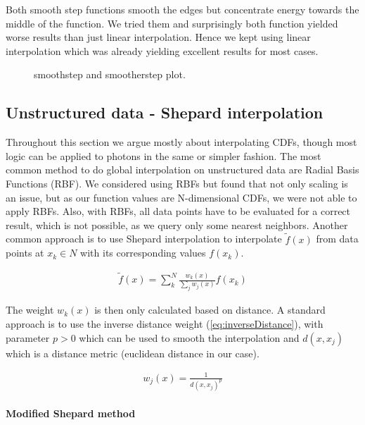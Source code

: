 Both smooth step functions smooth the edges but concentrate energy towards the middle of the function. We tried them and surprisingly both function yielded worse results than just linear interpolation. Hence we kept using linear interpolation which was already yielding excellent results for most cases.

\begin{figure}[htbp] 
	\centering
	\tiny
    
    \caption{smoothstep and smootherstep plot. } 
    \label{fig:smoothstep}
\end{figure}

\subsection{Unstructured data - Shepard interpolation}
\label{ch:unstructured}

Throughout this section we argue mostly about interpolating CDFs, though most logic can be applied to photons in the same or simpler fashion. The most common method to do global interpolation on unstructured data are Radial Basis Functions (RBF). We considered using RBFs but found that not only scaling is an issue, but as our function values are N-dimensional CDFs, we were not able to apply RBFs. Also, with RBFs, all data points have to be evaluated for a correct result, which is not possible, as we query only some nearest neighbors. Another common approach is to use Shepard interpolation to interpolate $\widetilde{f}(x)$ from data points at $x_k \in N$ with its corresponding values $f(x_k)$. 

\begin{align}\label{eq:shepard}
\widetilde{f}(x) = \sum_{k}^{N}\frac{w_k(x)}{\sum\nolimits_{j}w_j(x)}f(x_k)
\end{align}

The weight $w_k(x)$ is then only calculated based on distance. A standard approach is to use the inverse distance weight (\ref{eq:inverseDistance}), with parameter $p > 0$ which can be used to smooth the interpolation and $d(x, x_j)$ which is a distance metric (euclidean distance in our case).

\begin{align}\label{eq:inverseDistance}
w_j(x) = \frac{1}{d(x, x_j)^p}
\end{align}


\paragraph{Modified Shepard method}
\label{ch:modshep}



